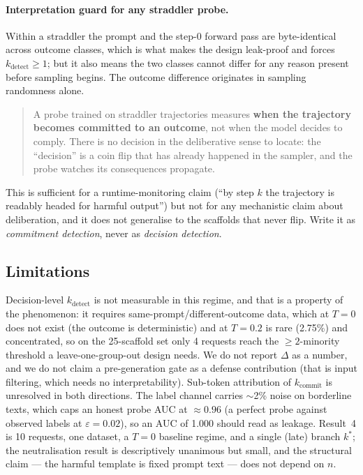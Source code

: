 \paragraph{Interpretation guard for any straddler probe.} Within a straddler the prompt
and the step-0 forward pass are byte-identical across outcome classes, which is what
makes the design leak-proof and forces $k_{\text{detect}} \ge 1$; but it also means the
two classes cannot differ for any reason present before sampling begins. The outcome
difference originates in sampling randomness alone.
\begin{quote}
A probe trained on straddler trajectories measures \textbf{when the trajectory becomes
committed to an outcome}, not when the model decides to comply. There is no decision in
the deliberative sense to locate: the ``decision'' is a coin flip that has already
happened in the sampler, and the probe watches its consequences propagate.
\end{quote}
This is sufficient for a runtime-monitoring claim (``by step $k$ the trajectory is
readably headed for harmful output'') but not for any mechanistic claim about
deliberation, and it does not generalise to the scaffolds that never flip. Write it as
\emph{commitment detection}, never as \emph{decision detection}.

\subsection{Limitations}
\label{ssec:limitations}

Decision-level $k_{\text{detect}}$ is not measurable in this regime, and that is a
property of the phenomenon: it requires same-prompt/different-outcome data, which at
$T{=}0$ does not exist (the outcome is deterministic) and at $T{=}0.2$ is rare (2.75\%)
and concentrated, so on the 25-scaffold set only 4 requests reach the $\ge 2$-minority
threshold a leave-one-group-out design needs. We do not report $\Delta$ as a number, and
we do not claim a pre-generation gate as a defense contribution (that is input filtering,
which needs no interpretability). Sub-token attribution of $k_{\text{commit}}$ is
unresolved in both directions. The label channel carries $\sim$2\% noise on borderline
texts, which caps an honest probe AUC at $\approx 0.96$ (a perfect probe against observed
labels at $\varepsilon = 0.02$), so an AUC of 1.000 should read as leakage. Result~4 is
10 requests, one dataset, a $T{=}0$ baseline regime, and a single (late) branch $k^\ast$;
the neutralisation result is descriptively unanimous but small, and the structural claim
--- the harmful template is fixed prompt text --- does not depend on $n$.

